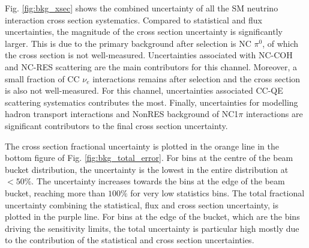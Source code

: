 Fig. \ref{fig:bkg_xsec} shows the combined uncertainty of all the SM neutrino interaction cross section systematics.
Compared to statistical and flux uncertainties, the magnitude of the cross section uncertainty is significantly larger.
This is due to the primary background after selection is NC $\pi^0$, of which the cross section is not well-measured.  
Uncertainties associated with NC-COH and NC-RES scattering are the main contributors for this channel.
Moreover, a small fraction of CC $\nu_e$ interactions remains after selection and the cross section is also not well-measured.
For this channel, uncertainties associated CC-QE scattering systematics contributes the most.
Finally, uncertainties for modelling hadron transport interactions and NonRES background of NC1$\pi$ interactions are significant contributors to the final cross section uncertainty.

The cross section fractional uncertainty is plotted in the orange line in the bottom figure of Fig. \ref{fig:bkg_total_error}.
For bins at the centre of the beam bucket distribution, the uncertainty is the lowest in the entire distribution at $< 50\%$.
The uncertainty increases towards the bins at the edge of the beam bucket, reaching more than $100 \%$ for very low statistics bins.
The total fractional uncertainty combining the statistical, flux and cross section uncertainty, is plotted in the purple line.
For bins at the edge of the bucket, which are the bins driving the sensitivity limits, the total uncertainty is particular high mostly due to the contribution of the statistical and cross section uncertainties.

